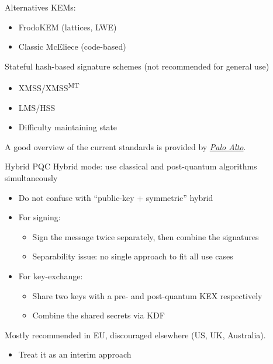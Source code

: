 \begin{frame}{Alternatives}
  KEMs:
  \begin{itemize}
    \item FrodoKEM (lattices, LWE)
    \item Classic McEliece (code-based)
  \end{itemize}

  \vspace*{1em}

  \pause
  Stateful hash-based signature schemes (not recommended for general use)
  \begin{itemize}
    \item XMSS/XMSS\textsuperscript{MT}
    \item LMS/HSS
    \item Difficulty maintaining state
  \end{itemize}

  \vspace*{1em}

  \pause
  A good overview of the current standards is provided by \href{https://www.paloaltonetworks.com/cyberpedia/pqc-standards}{\textit{Palo Alto}}.
\end{frame}

\begin{frame}{Hybrid PQC}
  Hybrid mode: use classical and post-quantum algorithms simultaneously
  \begin{itemize}[<+(1)->]
    \item Do not confuse with \enquote{public-key + symmetric} hybrid
    \item For signing:
    \begin{itemize}
      \item Sign the message twice separately, then combine the signatures
      \item Separability issue: no single approach to fit all use cases
    \end{itemize}
    \item For key-exchange:
    \begin{itemize}
      \item Share two keys with a pre- and post-quantum KEX respectively
      \item Combine the shared secrets via KDF
    \end{itemize}
  \end{itemize}

  \pause
  Mostly recommended in EU, discouraged elsewhere (US, UK, Australia).
  \begin{itemize}
    \item Treat it as an interim approach
  \end{itemize}
\end{frame}

